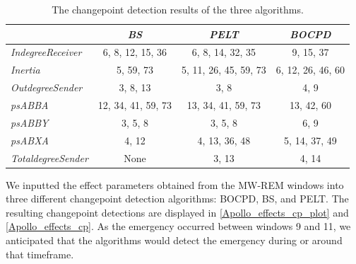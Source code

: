 \documentclass[]{interact}
\theoremstyle{plain}%
\theoremstyle{definition}
\theoremstyle{remark}
\begin{document}
{    \begin{table}[H]
    	\captionsetup{justification=raggedright}
    	\centering
    	\renewcommand{\arraystretch}{1.2} %
    	\small
    	\begin{tabular}{lccc}
    		\hline
    		& \textit{BS}        & \textit{PELT}         & \textit{BOCPD}                   \\ \hline
    		\textit{IndegreeReceiver}  & 6, 8, 12, 15, 36   & 6, 8, 14, 32, 35      & {\color[HTML]{000000} 9, 15, 37} \\
    		\textit{Inertia}           & 5, 59, 73          & 5, 11, 26, 45, 59, 73 & 6, 12, 26, 46, 60                \\
    		\textit{OutdegreeSender}   & 3, 8, 13           & 3, 8                  & 4, 9                             \\
    		\textit{psABBA}            & 12, 34, 41, 59, 73 & 13, 34, 41, 59, 73    & 13, 42, 60                       \\
    		\textit{psABBY}            & 3, 5, 8            & 3, 5, 8               & 6, 9                             \\
    		\textit{psABXA}            & 4, 12              & 4, 13, 36, 48         & 5, 14, 37, 49                    \\
    		\textit{TotaldegreeSender} & None               & 3, 13                 & 4, 14                            \\ \hline
    	\end{tabular}
    	\caption{The changepoint detection results of the three algorithms.}
    	\label{Apollo_effects_cp}
    \end{table}
	
	We inputted the effect parameters obtained from the MW-REM windows into three different changepoint detection algorithms: BOCPD, BS, and PELT. The resulting changepoint detections are displayed in \autoref{Apollo_effects_cp_plot} and \autoref{Apollo_effects_cp}. As the emergency occurred between windows 9 and 11, we anticipated that the algorithms would detect the emergency during or around that timeframe. \\
	
	
	
	
	
	
	
	
	
	
	
	
	
}
\end{document}
